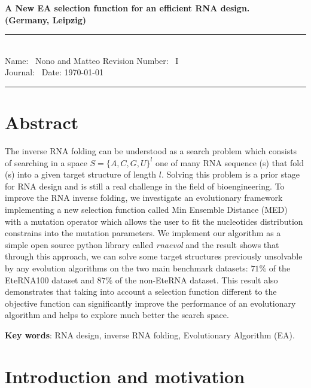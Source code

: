 \documentclass[english,12pt,a4paper]{article}
\theoremstyle{definition}
\begin{document}
	\begin{center}
		\textbf{A New EA selection function for an efficient RNA design.\\[0.5cm]
			(Germany, Leipzig)}
		\vspace{1.0cm}
	\end{center}
	
	\noindent
	\rule{17cm}{0.2cm}\\[0.3cm]
	Name: \ Nono and Matteo \hfill Revision Number: \ I \\[0.1cm]
	Journal: \ \hfill Date: \today\\
	\rule{17cm}{0.05cm}
	
	\section[I.]{Abstract}
	The inverse RNA folding can be understood as a search problem which consists of searching in a space $ S = \big \{A, C, G, U\big \}^l$ one of many RNA sequence (s) that fold (s) into a given target structure of length $l$.
	Solving this problem is a prior stage for RNA design and is still a real challenge in the field of bioengineering. To improve the RNA inverse folding, we investigate an evolutionary framework implementing a new selection function called Min Ensemble Distance (MED) with a mutation operator which allows the user to fit the nucleotides distribution constrains into the mutation parameters. We implement our algorithm as a simple open source python library called \textit{rnaevol} and the result shows that through this approach, we can solve some target structures previously unsolvable by any evolution algorithms on the two main benchmark datasets:  $71\%$ of the EteRNA100 dataset and $87\%$ of the non-EteRNA dataset. This result also demonstrates that taking into account a selection function different to the objective function can significantly improve the performance of an evolutionary algorithm and helps to explore much better the search space.
	\vspace{1cm}
	
	\textbf{Key words}: RNA design, inverse RNA folding, Evolutionary Algorithm (EA).

	\section{ Introduction and motivation }
\end{document}
